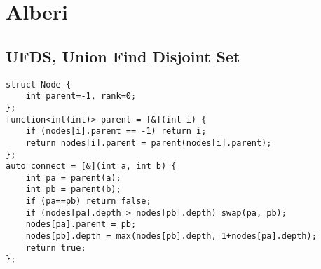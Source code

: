 \section{Alberi}

\subsection{UFDS, Union Find Disjoint Set}

\begin{lstlisting}
struct Node {
    int parent=-1, rank=0;
};
function<int(int)> parent = [&](int i) {
    if (nodes[i].parent == -1) return i;
    return nodes[i].parent = parent(nodes[i].parent);
};
auto connect = [&](int a, int b) {
    int pa = parent(a);
    int pb = parent(b);
    if (pa==pb) return false;
    if (nodes[pa].depth > nodes[pb].depth) swap(pa, pb);
    nodes[pa].parent = pb;
    nodes[pb].depth = max(nodes[pb].depth, 1+nodes[pa].depth);
    return true;
};
\end{lstlisting}

